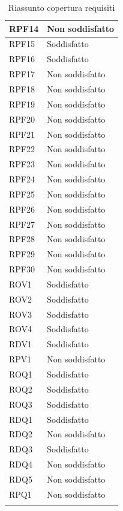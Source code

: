\begin{longtable}{| p{2.5cm} | p{3cm} |}
	RPF14 & Non soddisfatto \\ \hline
	RPF15 & Soddisfatto \\ \hline
	RPF16 & Soddisfatto \\ \hline
	RPF17 & Non soddisfatto \\ \hline
	RPF18 & Non soddisfatto \\ \hline
	RPF19 & Non soddisfatto \\ \hline
	RPF20 & Non soddisfatto \\ \hline
	RPF21 & Non soddisfatto \\ \hline
	RPF22 & Non soddisfatto \\ \hline
	RPF23 & Non soddisfatto \\ \hline
	RPF24 & Non soddisfatto \\ \hline
	RPF25 & Non soddisfatto \\ \hline
	RPF26 & Non soddisfatto \\ \hline
	RPF27 & Non soddisfatto \\ \hline
	RPF28 & Non soddisfatto \\ \hline
	RPF29 & Non soddisfatto \\ \hline
	RPF30 & Non soddisfatto \\ \hline
	ROV1 & Soddisfatto \\ \hline
	ROV2 & Soddisfatto \\ \hline
	ROV3 & Soddisfatto \\ \hline
	ROV4 & Soddisfatto \\ \hline
	RDV1 & Soddisfatto \\ \hline
	RPV1 & Non soddisfatto \\ \hline
	ROQ1 & Soddisfatto \\ \hline
	ROQ2 & Soddisfatto \\ \hline
	ROQ3 & Soddisfatto \\ \hline
	RDQ1 & Soddisfatto \\ \hline
	RDQ2 & Non soddisfatto \\ \hline
	RDQ3 & Soddisfatto \\ \hline
	RDQ4 & Non soddisfatto \\ \hline
	RDQ5 & Non soddisfatto \\ \hline
	RPQ1 & Non soddisfatto \\ \hline
	\caption{Riassunto copertura requisiti}
\end{longtable}


	
